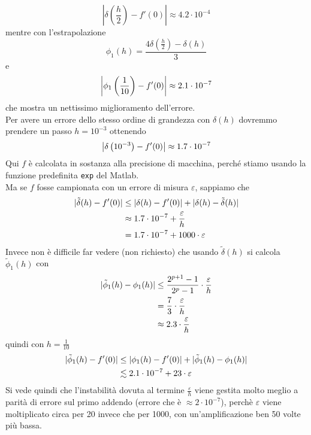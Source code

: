 \documentclass[12pt,a4paper]{article}
\DeclarePairedDelimiter{\abs}{\lvert}{\rvert}
\begin{document}
\begin{equation*}
    \left|\delta\left(\frac{h}{2}\right)-f'(0)\right|\approx4.2\cdot 10^{-4}
\end{equation*}
mentre con l'estrapolazione
\[\phi_1(h) = \frac{4\delta \left( \frac{h}{2} \right) - \delta(h)}{3}\] e
\[ \abs*{\phi_1 \left(\frac{1}{10}\right) - f'(0)} \approx 2.1 \cdot 10^{-7}\]
che mostra un nettissimo miglioramento dell'errore. \\
Per avere un errore dello stesso ordine di grandezza con $\delta(h)$ dovremmo prendere un passo $h = 10^{-3}$ ottenendo
\[ \abs*{\delta \left(10^{-3}\right) - f'(0)} \approx 1.7 \cdot 10^{-7}\]
Qui $f$ è calcolata in sostanza alla precisione di macchina,
perché stiamo usando la funzione predefinita \texttt{exp} del Matlab.\\
Ma se $f$ fosse campionata con un errore di misura $\varepsilon$, sappiamo che
\[\begin{split}
    \abs{\tilde{\delta}(h) - f'(0)} & \le \abs{\delta(h) - f'(0)} + \abs{\delta(h) - \tilde{\delta}(h)} \\
    & \approx 1.7 \cdot 10^{-7} + \frac{\varepsilon}{h} \\
    & = 1.7 \cdot 10^{-7} + 1000 \cdot \varepsilon
\end{split}\]
Invece non è difficile far vedere (non richiesto) che usando $\tilde{\delta}(h)$ si calcola $\tilde{\phi}_1 (h)$ con
\[\begin{split}
    \abs{\tilde{\phi}_1 (h) - \phi_1(h)} & \le \frac{2^{p+1} - 1}{2^p-1}\cdot \frac{\varepsilon}{h} \\
    & = \frac{7}{3} \cdot \frac{\varepsilon}{h} \\
    & \approx 2.3 \cdot \frac{\varepsilon}{h}
\end{split}\]
quindi con $h=\frac{1}{10}$
\[\begin{split}
    \abs{\tilde{\phi}_1 (h) - f'(0)} & \le \abs{\phi_1(h) - f'(0)} + \abs{\tilde{\phi}_1 (h) - \phi_1(h)} \\
    & \lesssim 2.1 \cdot 10^{-7} + 23 \cdot\varepsilon 
\end{split}\]
Si vede quindi che l'instabilità dovuta al termine $\frac{\varepsilon}{h}$ viene gestita molto meglio a parità di errore sul primo addendo (errore che è $\approx 2 \cdot 10^{-7}$), perchè $\varepsilon$ viene moltiplicato circa per 20 invece che per 1000, con un'amplificazione ben 50 volte più bassa. \\
\end{document}
